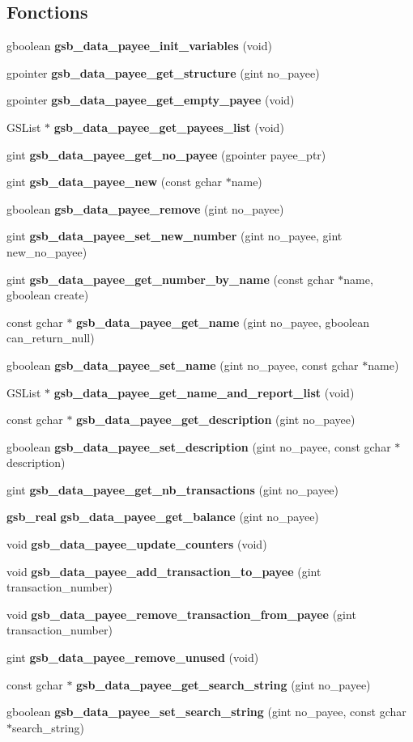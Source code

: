 \subsection*{Fonctions}
\begin{DoxyCompactItemize}
\item 
gboolean {\bf gsb\_\-data\_\-payee\_\-init\_\-variables} (void)
\item 
gpointer {\bf gsb\_\-data\_\-payee\_\-get\_\-structure} (gint no\_\-payee)
\item 
gpointer {\bf gsb\_\-data\_\-payee\_\-get\_\-empty\_\-payee} (void)
\item 
GSList $\ast$ {\bf gsb\_\-data\_\-payee\_\-get\_\-payees\_\-list} (void)
\item 
gint {\bf gsb\_\-data\_\-payee\_\-get\_\-no\_\-payee} (gpointer payee\_\-ptr)
\item 
gint {\bf gsb\_\-data\_\-payee\_\-new} (const gchar $\ast$name)
\item 
gboolean {\bf gsb\_\-data\_\-payee\_\-remove} (gint no\_\-payee)
\item 
gint {\bf gsb\_\-data\_\-payee\_\-set\_\-new\_\-number} (gint no\_\-payee, gint new\_\-no\_\-payee)
\item 
gint {\bf gsb\_\-data\_\-payee\_\-get\_\-number\_\-by\_\-name} (const gchar $\ast$name, gboolean create)
\item 
const gchar $\ast$ {\bf gsb\_\-data\_\-payee\_\-get\_\-name} (gint no\_\-payee, gboolean can\_\-return\_\-null)
\item 
gboolean {\bf gsb\_\-data\_\-payee\_\-set\_\-name} (gint no\_\-payee, const gchar $\ast$name)
\item 
GSList $\ast$ {\bf gsb\_\-data\_\-payee\_\-get\_\-name\_\-and\_\-report\_\-list} (void)
\item 
const gchar $\ast$ {\bf gsb\_\-data\_\-payee\_\-get\_\-description} (gint no\_\-payee)
\item 
gboolean {\bf gsb\_\-data\_\-payee\_\-set\_\-description} (gint no\_\-payee, const gchar $\ast$description)
\item 
gint {\bf gsb\_\-data\_\-payee\_\-get\_\-nb\_\-transactions} (gint no\_\-payee)
\item 
{\bf gsb\_\-real} {\bf gsb\_\-data\_\-payee\_\-get\_\-balance} (gint no\_\-payee)
\item 
void {\bf gsb\_\-data\_\-payee\_\-update\_\-counters} (void)
\item 
void {\bf gsb\_\-data\_\-payee\_\-add\_\-transaction\_\-to\_\-payee} (gint transaction\_\-number)
\item 
void {\bf gsb\_\-data\_\-payee\_\-remove\_\-transaction\_\-from\_\-payee} (gint transaction\_\-number)
\item 
gint {\bf gsb\_\-data\_\-payee\_\-remove\_\-unused} (void)
\item 
const gchar $\ast$ {\bf gsb\_\-data\_\-payee\_\-get\_\-search\_\-string} (gint no\_\-payee)
\item 
gboolean {\bf gsb\_\-data\_\-payee\_\-set\_\-search\_\-string} (gint no\_\-payee, const gchar $\ast$search\_\-string)
\end{DoxyCompactItemize}
